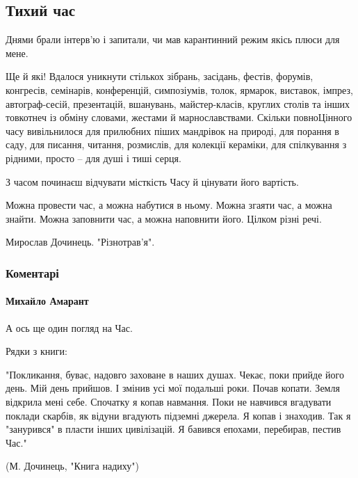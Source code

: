  
 
 

\subsection{Тихий час}

Днями брали інтерв’ю і запитали, чи мав карантинний режим якісь плюси для мене.

Ще й які! Вдалося уникнути стількох зібрань, засідань, фестів, форумів,
конгресів, семінарів, конференцій, симпозіумів, толок, ярмарок, виставок,
імпрез, автограф-сесій, презентацій, вшанувань, майстер-класів, круглих столів
та інших товкотнеч із обміну словами, жестами й марнославствами. Скільки
повноЦінного часу вивільнилося для прилюбних піших мандрівок на природі, для
порання в саду, для писання, читання, розмислів, для колекції кераміки, для
спілкування з рідними, просто – для душі і тиші серця.

З часом починаєш відчувати місткість Часу й цінувати його вартість.

Можна провести час, а можна набутися в ньому. Можна згаяти час, а можна
знайти. Можна заповнити час, а можна наповнити його. Цілком різні речі.

Мирослав Дочинець. "Різнотрав'я".

\subsubsection{Коментарі}

\paragraph{Михайло Амарант}

А ось ще один погляд на Час.

Рядки з книги:

"Покликання, буває, надовго заховане в наших душах.  Чекає, поки прийде його
день. Мій день прийшов. І змінив усі мої подальші роки. Почав копати.  Земля
відкрила мені себе.  Спочатку я копав навмання. Поки не навчився вгадувати
поклади скарбів, як відуни вгадують підземні джерела.  Я копав і знаходив. Так
я "занурився" в пласти інших цивілізацій.  Я бавився епохами, перебирав, пестив
Час."

(М. Дочинець, "Книга надиху")
